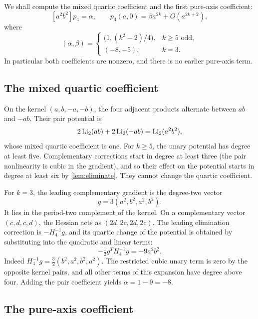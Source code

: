 We shall compute the mixed quartic coefficient and the first pure-axis
coefficient:
\begin{equation}\label{eq:alphabeta}
 [a^2b^2]p_4=\alpha,\qquad
 p_4(a,0)=\beta a^{2k}+O(a^{2k+2}),
\end{equation}
where
\begin{equation}\label{eq:coefficientvalues}
 (\alpha,\beta)=
 \begin{cases}
  \bigl(1,(k^2-2)/4\bigr),&k\geq5\text{ odd},\\
  (-8,-5),&k=3.
 \end{cases}
\end{equation}
In particular both coefficients are nonzero, and there is no earlier
pure-axis term.

\subsection{The mixed quartic coefficient}

On the kernel $(a,b,-a,-b)$, the four adjacent products alternate between
$ab$ and $-ab$. Their pair potential is
\[
 2\operatorname{Li}_2(ab)+2\operatorname{Li}_2(-ab)=\operatorname{Li}_2(a^2b^2),
\]
whose mixed quartic coefficient is one. For $k\geq5$, the unary potential
has degree at least five. Complementary corrections start in degree at
least three (the pair nonlinearity is cubic in the gradient), and so their
effect on the potential starts in degree at least six by
\cref{lem:eliminate}. They cannot change the quartic coefficient.

For $k=3$, the leading complementary gradient is the degree-two vector
\[
 g=3(a^2,b^2,a^2,b^2).
\]
It lies in the period-two complement of the kernel. On a complementary
vector $(c,d,c,d)$, the Hessian acts as $(2d,2c,2d,2c)$. The leading
elimination correction is $-H_4^{-1}g$, and its quartic change of the
potential is obtained by substituting into the quadratic and linear terms:
\begin{equation}\label{eq:quarticcorrection}
 -\tfrac12 g^TH_4^{-1}g=-9a^2b^2.
\end{equation}
Indeed $H_4^{-1}g=\tfrac32(b^2,a^2,b^2,a^2)$.
The restricted cubic unary term is zero by the opposite kernel pairs,
and all other terms of this expansion have degree above four.
Adding the pair coefficient yields $\alpha=1-9=-8$.

\subsection{The pure-axis coefficient}

